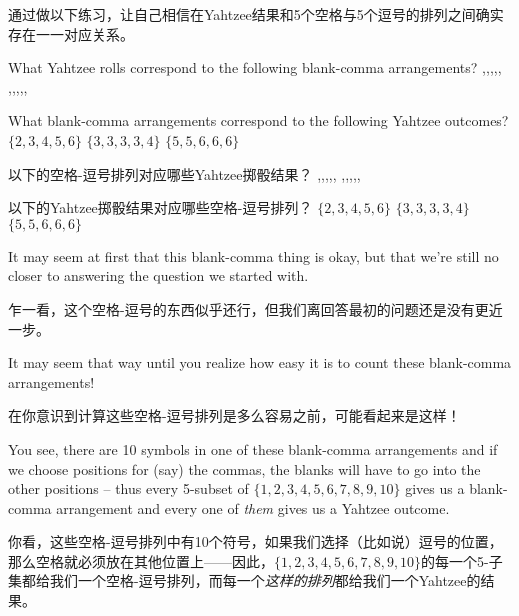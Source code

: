 通过做以下练习，让自己相信在Yahtzee结果和5个空格与5个逗号的排列之间确实存在一一对应关系。

\begin{exer}
What Yahtzee rolls correspond to the following blank-comma arrangements?
\noindent {\LARGE \blnk,\blnk,\blnk,\blnk,\blnk,} \hspace{\fill} {\LARGE \blnk\blnk,\blnk\blnk\blnk,,,,}  \hspace{\fill} {\LARGE ,,,,,\blnk\blnk\blnk\blnk\blnk}
\medskip

What blank-comma arrangements correspond to the following Yahtzee outcomes?
\noindent $\{2,3,4,5,6\}$  \hspace{\fill} $\{3,3,3,3,4\}$  \hspace{\fill} $\{5,5,6,6,6\}$

\end{exer}   

\begin{exer}
以下的空格-逗号排列对应哪些Yahtzee掷骰结果？
\noindent {\LARGE \blnk,\blnk,\blnk,\blnk,\blnk,} \hspace{\fill} {\LARGE \blnk\blnk,\blnk\blnk\blnk,,,,}  \hspace{\fill} {\LARGE ,,,,,\blnk\blnk\blnk\blnk\blnk}
\medskip

以下的Yahtzee掷骰结果对应哪些空格-逗号排列？
\noindent $\{2,3,4,5,6\}$  \hspace{\fill} $\{3,3,3,3,4\}$  \hspace{\fill} $\{5,5,6,6,6\}$
\end{exer}

It may seem at first that this blank-comma thing is okay, but that we're 
still no closer to answering the question we started with.

乍一看，这个空格-逗号的东西似乎还行，但我们离回答最初的问题还是没有更近一步。

It may seem
that way until you realize how easy it is to count these blank-comma
arrangements!

在你意识到计算这些空格-逗号排列是多么容易之前，可能看起来是这样！

You see, there are 10 symbols in one of these blank-comma 
arrangements
and if we choose positions for (say) the commas, the blanks will have to go
into the other positions -- thus every 5-subset of $\{1,2,3,4,5,6,7,8,9,10\}$
gives us a blank-comma arrangement and every one of \emph{them} gives us
a Yahtzee outcome.

你看，这些空格-逗号排列中有10个符号，如果我们选择（比如说）逗号的位置，那么空格就必须放在其他位置上——因此，$\{1,2,3,4,5,6,7,8,9,10\}$的每一个5-子集都给我们一个空格-逗号排列，而每一个\emph{这样的排列}都给我们一个Yahtzee的结果。


